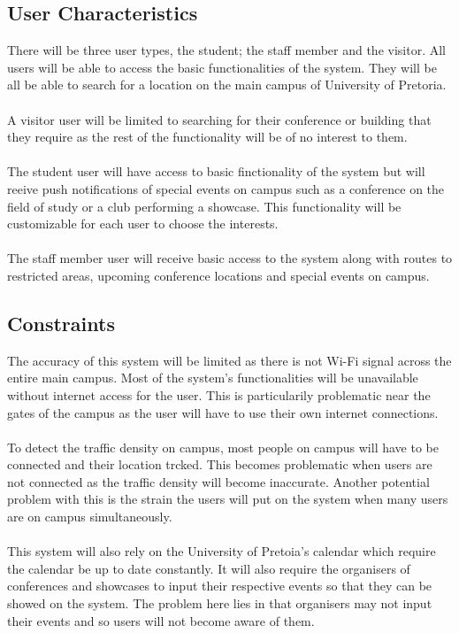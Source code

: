 \documentclass{article}
\begin{document}
	\subsection{User Characteristics}
	There will be three user types, the student; the staff member and the visitor. All users will be able to access
	the basic functionalities of the system. They will be all be able to search for a location on the main campus 
	of University of Pretoria. \\\\
	A visitor user will be limited to searching for their conference or building that they
	require as the rest of the functionality will be of no interest to them.\\\\
	The student user will have access to basic finctionality of the system but will reeive push notifications of special events on
	campus such as a conference on the field of study or a club performing a showcase. This functionality will be 
	customizable for each user to choose the interests.\\\\
	The staff member user will receive basic access to the system along with routes to restricted areas, upcoming conference
	locations and special events on campus.
	\subsection{Constraints}
	The accuracy of this system will be limited as there is not Wi-Fi signal across the entire main campus. Most of the
	system's functionalities will be unavailable without internet access for the user. This is particularily problematic
	near the gates of the campus as the user will have to use their own internet connections.\\\\
	To detect the traffic density on campus, most people on campus will have to be connected and their location trcked.
	This becomes problematic when users are not connected as the traffic density will become inaccurate. Another potential
	problem with this is the strain the users will put on the system when many users are on campus simultaneously.\\\\
	This system will also rely on the University of Pretoia's calendar which require the calendar be up to date constantly.
	It will also require the organisers of conferences and showcases to input their respective events so that they can be showed 
	on the system. The problem here lies in that organisers may not input their events and so users will not become aware of them.
\end{document}
